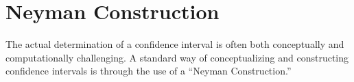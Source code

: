 \section{Neyman Construction}

The actual determination of a confidence interval is often both conceptually and computationally challenging.
A standard way of conceptualizing and constructing confidence intervals is through the use of a ``Neyman Construction.''





